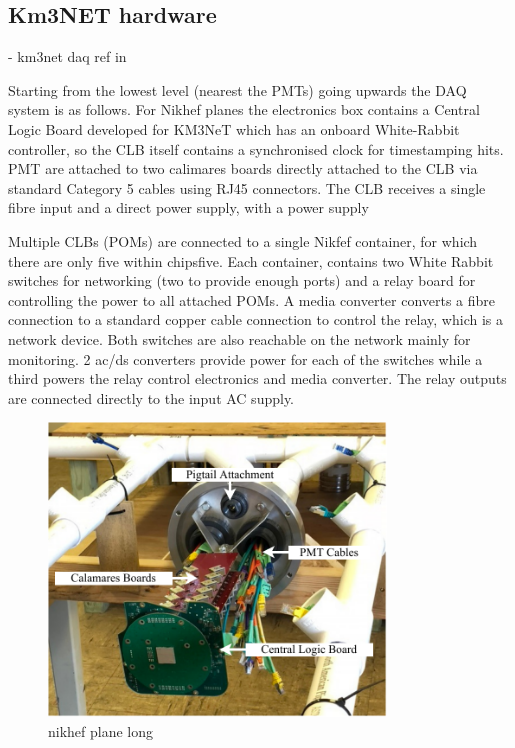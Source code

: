 \subsection{Km3NET hardware} %
\label{sec:daq_hard_km3net} %

- km3net daq ref in~\cite{biagi2015, adrian2016, eijk2015}

Starting from the lowest level (nearest the PMTs) going upwards the DAQ system is as follows. For
Nikhef planes the electronics box contains a Central Logic Board developed for KM3NeT which has an
onboard White-Rabbit controller, so the CLB itself contains a synchronised clock for timestamping
hits. PMT are attached to two calimares boards directly attached to the CLB via standard Category
5 cables using RJ45 connectors. The CLB receives a single fibre input and a direct power supply,
with a power supply

Multiple CLBs (POMs) are connected to a single Nikfef container, for which there are only five
within chipsfive. Each container, contains two White Rabbit switches for networking (two to
provide enough ports) and a relay board for controlling the power to all attached POMs. A media
converter converts a fibre connection to a standard copper cable connection to control the relay,
which is a network device. Both switches are also reachable on the network mainly for monitoring.
2 ac/ds converters provide power for each of the switches while a third powers the relay control
electronics and media converter. The relay outputs are connected directly to the input AC supply.

\begin{figure} %
    \includegraphics[width=0.8\textwidth]{diagrams/5-daq/nikhef_plane.pdf}
    \caption[nikhef plane short]
    {nikhef plane long}
    \label{fig:nikhef_plane}
\end{figure}

